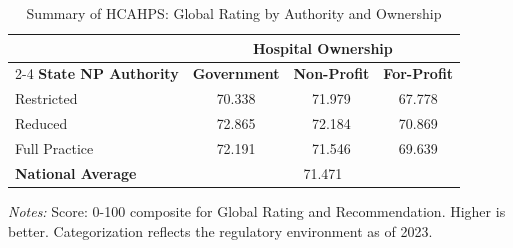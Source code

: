 \begin{table}[htbp]
    \centering
    \caption{Summary of HCAHPS: Global Rating by Authority and Ownership}
    \label{tab:hcahps_grp4_own}
    \vspace{0.2cm}
    \begin{tabular}{lccc}
        \toprule
        & \multicolumn{3}{c}{\textbf{Hospital Ownership}} \\
        \cmidrule(lr){2-4}
        \textbf{State NP Authority} & \textbf{Government} & \textbf{Non-Profit} & \textbf{For-Profit} \\
        \midrule
        Restricted & 70.338 & 71.979 & 67.778 \\
        Reduced & 72.865 & 72.184 & 70.869 \\
        Full Practice & 72.191 & 71.546 & 69.639 \\
        \midrule
        \textbf{National Average} & \multicolumn{3}{c}{71.471} \\
        \bottomrule
    \end{tabular}
    \vspace{0.1cm}
    \begin{minipage}{0.85\textwidth}
        \footnotesize \textit{Notes:} Score: 0-100 composite for Global Rating and Recommendation. Higher is better. Categorization reflects the regulatory environment as of 2023.
    \end{minipage}
\end{table}